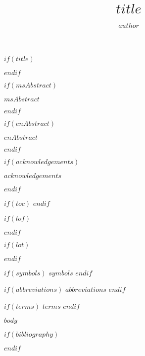 \documentclass[bahasa,nohyphen]{GayaUKM}
\title{$title$}
\author{$author$}
\begin{document}
$if(title)$
\maketitle
$endif$

\frontmatter
\declaration

$if(msAbstract)$
  \begin{msAbstract}
    $msAbstract$
  \end{msAbstract}
$endif$

$if(enAbstract)$
  \begin{enAbstract}[$en-title$]
    $enAbstract$
  \end{enAbstract}
$endif$

$if(acknowledgements)$
  \begin{acknowledgements}
    $acknowledgements$
  \end{acknowledgements}
$endif$

$if(toc)$
  \tableofcontents
$endif$

$if(lof)$
  \listoffigures
$endif$

$if(lot)$
  \listoftables
$endif$

$if(symbols)$
  $symbols$
$endif$

$if(abbreviations)$
  $abbreviations$
$endif$

$if(terms)$
  $terms$
$endif$

\mainmatter

$body$

$if(bibliography)$

$endif$
\end{document}
